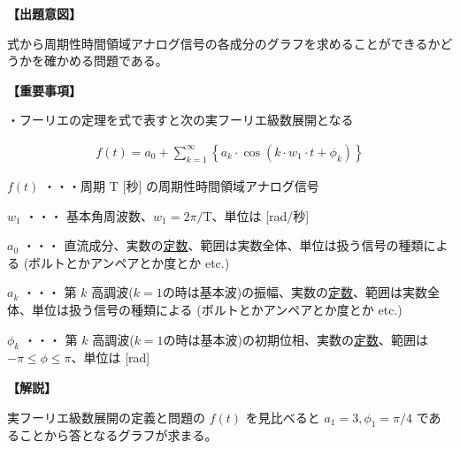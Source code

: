 \noindent \textbf{【出題意図】}

\noindent 式から周期性時間領域アナログ信号の各成分のグラフを求めることができるかどうかを確かめる問題である。

\vspace{1em}
\noindent \textbf{【重要事項】}

\medskip
\noindent ・フーリエの定理を式で表すと次の実フーリエ級数展開となる

\begin{align*}
f(t) = a_0 + \sum_{k=1}^{\infty}
\left \{
a_k \cdot \cos (k \cdot w_1 \cdot t + \phi_k)
\right \}
\end{align*}

\medskip
\noindent $f(t)$ ・・・周期 $\textrm{T}$ [秒] の周期性時間領域アナログ信号

\medskip
\noindent $w_1$ ・・・ 基本角周波数、$w_1 = 2\pi/\textrm{T}$、単位は [rad/秒]

\medskip
\noindent $a_0$ ・・・ 直流成分、実数の\underline{定数}、範囲は実数全体、単位は扱う信号の種類による (ボルトとかアンペアとか度とか etc.)

\medskip
\noindent $a_k$ ・・・ 第 $k$ 高調波($k=1$の時は基本波)の振幅、実数の\underline{定数}、範囲は実数全体、単位は扱う信号の種類による (ボルトとかアンペアとか度とか etc.)

\medskip
\noindent $\phi_k$ ・・・ 第 $k$ 高調波($k=1$の時は基本波)の初期位相、実数の\underline{定数}、範囲は $-\pi \leq \phi \leq \pi$、単位は [rad]


\vspace{1em}
\noindent \textbf{【解説】}

\noindent 実フーリエ級数展開の定義と問題の $f(t)$ を見比べると $a_1 = 3, \phi_1 = \pi/4$ であることから答となるグラフが求まる。

